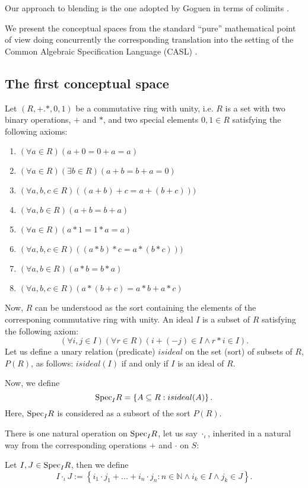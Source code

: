 Our approach to blending is the one adopted by Goguen in terms of
colimits \parencite{Gog99,Goguen01,Goguen05c}.

We present the conceptual spaces from the standard ``pure'' mathematical
point of view doing concurrently the corresponding translation into
the setting of the Common Algebraic Specification Language (CASL)
\parencite{BidoitMosses2004}.

\subsection{The first conceptual space}
Let $(R,+.*,0,1)$ be a commutative ring with unity, i.e. $R$ is a set with two binary operations, $+$ and $*$, and two special elements $0,1\in R$ satisfying the following axioms:
\begin{enumerate}
\item $(\forall a\in R)(a+0=0+a=a)$
\item $(\forall a\in R)(\exists b\in R)(a+b=b+a=0)$
\item $(\forall a,b,c \in R)((a+b)+c=a+(b+c)))$
\item $(\forall a,b \in R)(a+b=b+a)$
\item $(\forall a\in R)(a*1=1*a=a)$
\item $(\forall a,b,c \in R)((a*b)*c=a*(b*c)))$
\item $(\forall a,b \in R)(a*b=b*a)$
\item $(\forall a,b,c \in R)(a*(b+c)=a*b+a*c)$
\end{enumerate}
Now, $R$ can be understood as the sort containing the elements of the corresponing commutative ring with unity.
An ideal $I$ is a subset of $R$ satisfying the following axiom:
\[(\forall i,j\in I)(\forall r\in R)(i+(-j)\in I \wedge r*i\in I).\]
\newline\indent 
Let us define a unary relation (predicate) $isideal$ on the set (sort) of subsets of $R$, $P(R)$, as follows:
$isideal(I)$ if and only if $I$ is an ideal of $R$.

Now, we define
\[{\rm Spec}_IR=\left\{A\subseteq R: isideal(A) \right\}.\]
Here, ${\rm Spec}_IR$ is considered as a subsort of the sort $P(R)$.

There is one natural operation on ${\rm Spec}_IR$, let us say
$\cdot_{\iota}$, inherited in a natural way from the corresponding
operations $+$ and $\cdot$ on $S$:

 Let $I,J\in {\rm Spec}_IR$, then we define 
%
\[I\cdot_{\iota} J:=\left\{i_1\cdot j_1+...+i_n\cdot j_n:n \in \mathbb{N} \wedge i_k\in I \wedge j_k\in J \right\}.\]

